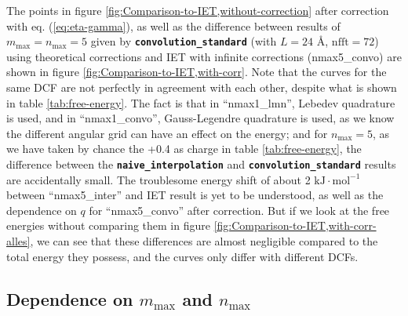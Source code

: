 The points in figure \ref{fig:Comparison-to-IET,without-correction}
after correction with eq. (\ref{eq:eta-gamma}), as well as the difference
between results of $m_{\max}=n_{\max}=5$ given by \texttt{\textbf{convolution\_standard}}
(with $L=24$ $\textrm{Å}$, $\mathrm{nfft}=72$) using theoretical
corrections and \acs{IET} with infinite corrections (nmax5\_convo)
are shown in figure \ref{fig:Comparison-to-IET,with-corr}. Note that
the curves for the same \acs{DCF} are not perfectly in agreement
with each other, despite what is shown in table \ref{tab:free-energy}.
The fact is that in ``nmax1\_lmn'', Lebedev quadrature is used,
and in ``nmax1\_convo'', Gauss-Legendre quadrature is used, as we
know the different angular grid can have an effect on the energy;
and for $n_{\max}=5$, as we have taken by chance the +0.4 as charge
in table \ref{tab:free-energy}, the difference between the \texttt{\textbf{naive\_interpolation}}
and \texttt{\textbf{convolution\_standard}} results are accidentally
small. The troublesome energy shift of about 2 $\mathrm{kJ}\cdot\mathrm{mol^{-1}}$
between ``nmax5\_inter'' and \acs{IET} result is yet to be understood,
as well as the dependence on $q$ for ``nmax5\_convo'' after correction.
But if we look at the free energies without comparing them in figure
\ref{fig:Comparison-to-IET,with-corr-alles}, we can see that these
differences are almost negligible compared to the total energy they
possess, and the curves only differ with different \acs{DCF}s.

\subsection{Dependence on $m_{\max}$ and $n_{\max}$}

